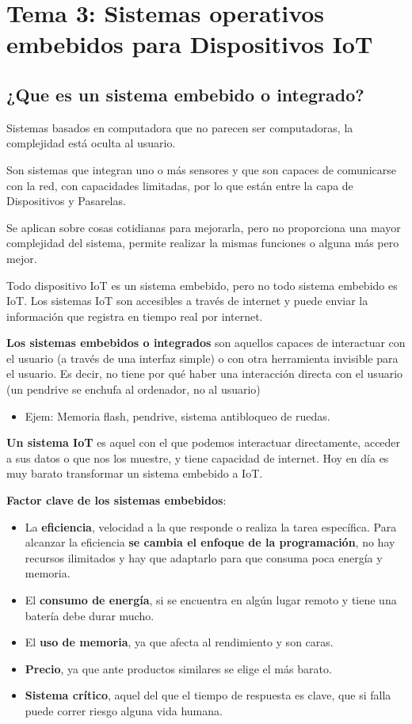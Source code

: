\documentclass[12pt, twoside, openright]{report} %
\begin{document}
\chapter{Tema 3: Sistemas operativos embebidos para Dispositivos
  IoT}

\section{¿Que es un sistema embebido o
  integrado?}

Sistemas basados en computadora que no parecen ser computadoras, la complejidad está oculta al usuario.

Son sistemas que integran uno o más sensores y que son capaces de
comunicarse con la red, con capacidades limitadas, por lo que están
entre la capa de Dispositivos y Pasarelas.

Se aplican sobre cosas cotidianas para mejorarla, pero no
proporciona una mayor complejidad del sistema, permite realizar la
mismas funciones o alguna más pero mejor.

Todo dispositivo IoT es un sistema embebido, pero no todo sistema
embebido es IoT. Los sistemas IoT son accesibles a través de internet y
puede enviar la información que registra en tiempo real por internet.

\textbf{Los sistemas embebidos o integrados} son aquellos capaces de
interactuar con el usuario (a través de una interfaz simple) o con otra herramienta invisible para el usuario. Es decir, no tiene por qué haber una interacción directa con el usuario (un pendrive se enchufa al ordenador, no al usuario)

\begin{itemize}
	\item Ejem: Memoria flash, pendrive, sistema antibloqueo de ruedas.
\end{itemize}

\textbf{Un sistema IoT} es aquel con el que podemos interactuar
directamente, acceder a sus datos o que nos los muestre, y tiene
capacidad de internet. Hoy en día es muy barato transformar un sistema
embebido a IoT.

\textbf{Factor clave de los sistemas embebidos}:

\begin{itemize}
	\item La \textbf{eficiencia}, velocidad a la que responde o realiza la tarea
	      específica. Para alcanzar la eficiencia \textbf{se cambia el enfoque
		      de la programación}, no hay recursos ilimitados y hay que adaptarlo
	      para que consuma poca energía y memoria.
	\item El \textbf{consumo de energía}, si se encuentra en algún lugar remoto
	      y tiene una batería debe durar mucho.
	\item El \textbf{uso de memoria}, ya que afecta al rendimiento y son caras.
	\item \textbf{Precio}, ya que ante productos similares se elige el más
	      barato.
	\item \textbf{Sistema crítico}, aquel del que el tiempo de respuesta es
	      clave, que si falla puede correr riesgo alguna vida humana.
\end{itemize}
\end{document}
